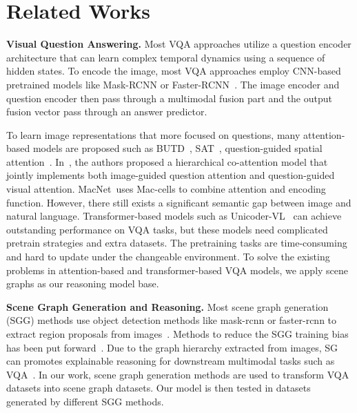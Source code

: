 \documentclass[letterpaper]{article} %
\begin{document}
\section{Related Works}
\noindent\textbf{Visual Question Answering.}
Most VQA approaches utilize a question encoder architecture that can learn complex temporal dynamics using a sequence of hidden states. To encode the image, most VQA approaches employ CNN-based pretrained models like Mask-RCNN or Faster-RCNN~\cite{DBLP:conf/cvpr/FanZ18,DBLP:conf/cvpr/PatroN18,DBLP:conf/cvpr/NamHK17}. The image encoder and question encoder then pass through a multimodal fusion part and the output fusion vector pass through an answer predictor.

To learn image representations that more focused on questions, many attention-based models are proposed such as BUTD~\cite{DBLP:conf/cvpr/00010BT0GZ18}, SAT~\cite{DBLP:conf/cvpr/YangHGDS16}, question-guided spatial attention~\cite{DBLP:conf/eccv/XuS16}. In~\citet{DBLP:conf/nips/LuYBP16}, the authors proposed a hierarchical co-attention model that jointly implements both image-guided question attention and question-guided visual attention.  MacNet~\cite{DBLP:conf/iclr/HudsonM18}uses Mac-cells to combine attention and encoding function. However, there still exists a significant semantic gap between image and natural language. Transformer-based models such as Unicoder-VL~\cite{DBLP:conf/aaai/LiDFGJ20} can achieve outstanding performance on VQA tasks, but these models need complicated pretrain strategies and extra datasets. The pretraining tasks are time-consuming and hard to update under the changeable environment. To solve the existing problems in attention-based and transformer-based VQA models, we apply scene graphs as our reasoning model base.

\vspace{0.05in}
\noindent\textbf{Scene Graph Generation and Reasoning.}
Most scene graph generation (SGG) methods use object detection methods like mask-rcnn or faster-rcnn to extract region proposals from images~\cite{DBLP:conf/cvpr/XuZCF17,DBLP:conf/eccv/YangLLBP18,DBLP:conf/cvpr/ZellersYTC18,DBLP:conf/nips/WooKCK18,DBLP:conf/cvpr/DaiZL17,DBLP:conf/iccv/LiOZWW17,DBLP:conf/eccv/YinSLYWSL18}. Methods to reduce the SGG training bias has been put forward~\cite{DBLP:conf/cvpr/TangNHSZ20}. Due to the graph hierarchy extracted from images, SG can promotes explainable reasoning for downstream multimodal tasks such as VQA~\cite{DBLP:conf/bmvc/ZhangCX19}. In our work, scene graph generation methods are used to transform VQA datasets into scene graph datasets. Our model is then tested in datasets generated by different SGG methods.
\end{document}
